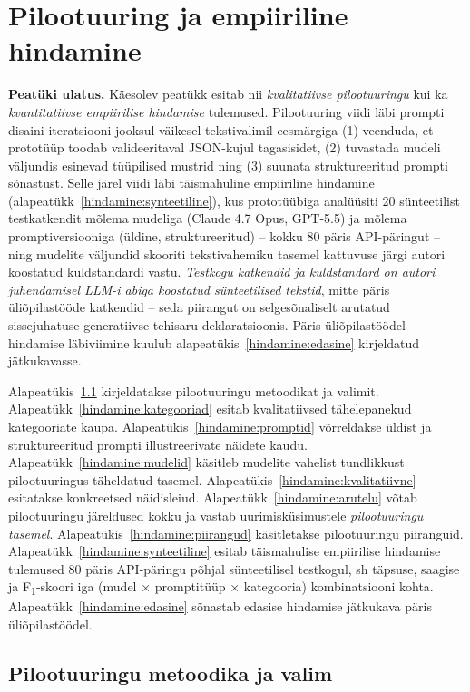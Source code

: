 \section{Pilootuuring ja empiiriline hindamine} \label{hindamine}

\textbf{Peatüki ulatus.} Käesolev peatükk esitab nii \emph{kvalitatiivse pilootuuringu} kui ka \emph{kvantitatiivse empiirilise hindamise} tulemused. Pilootuuring viidi läbi prompti disaini iteratsiooni jooksul väikesel tekstivalimil eesmärgiga (1) veenduda, et prototüüp toodab valideeritaval JSON-kujul tagasisidet, (2) tuvastada mudeli väljundis esinevad tüüpilised mustrid ning (3) suunata struktureeritud prompti sõnastust. Selle järel viidi läbi täismahuline empiiriline hindamine (alapeatükk~\ref{hindamine:synteetiline}), kus prototüübiga analüüsiti 20 sünteetilist testkatkendit mõlema mudeliga (Claude 4.7 Opus, GPT-5.5) ja mõlema promptiversiooniga (üldine, struktureeritud) -- kokku 80 päris API-päringut -- ning mudelite väljundid skooriti tekstivahemiku tasemel kattuvuse järgi autori koostatud kuldstandardi vastu. \emph{Testkogu katkendid ja kuldstandard on autori juhendamisel LLM-i abiga koostatud sünteetilised tekstid}, mitte päris üliõpilastööde katkendid -- seda piirangut on selgesõnaliselt arutatud sissejuhatuse generatiivse tehisaru deklaratsioonis. Päris üliõpilastöödel hindamise läbiviimine kuulub alapeatükis~\ref{hindamine:edasine} kirjeldatud jätkukavasse.

Alapeatükis~\ref{hindamine:ulevaade} kirjeldatakse pilootuuringu metoodikat ja valimit. Alapeatükk~\ref{hindamine:kategooriad} esitab kvalitatiivsed tähelepanekud kategooriate kaupa. Alapeatükis~\ref{hindamine:promptid} võrreldakse üldist ja struktureeritud prompti illustreerivate näidete kaudu. Alapeatükk~\ref{hindamine:mudelid} käsitleb mudelite vahelist tundlikkust pilootuuringus täheldatud tasemel. Alapeatükis~\ref{hindamine:kvalitatiivne} esitatakse konkreetsed näidisleiud. Alapeatükk~\ref{hindamine:arutelu} võtab pilootuuringu järeldused kokku ja vastab uurimisküsimustele \emph{pilootuuringu tasemel}. Alapeatükis~\ref{hindamine:piirangud} käsitletakse pilootuuringu piiranguid. Alapeatükk~\ref{hindamine:synteetiline} esitab täismahulise empiirilise hindamise tulemused 80 päris API-päringu põhjal sünteetilisel testkogul, sh täpsuse, saagise ja F\textsubscript{1}-skoori iga (mudel × promptitüüp × kategooria) kombinatsiooni kohta. Alapeatükk~\ref{hindamine:edasine} sõnastab edasise hindamise jätkukava päris üliõpilastöödel.

\subsection{Pilootuuringu metoodika ja valim} \label{hindamine:ulevaade}

